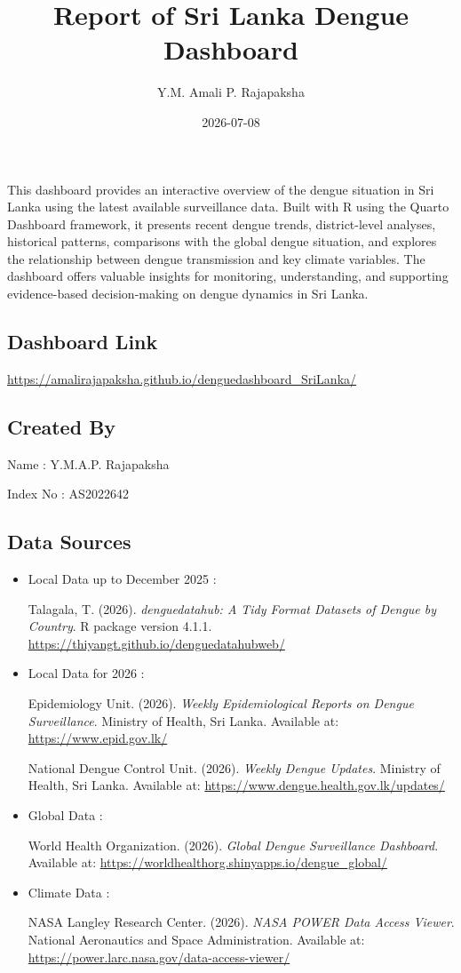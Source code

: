 \documentclass[
  letterpaper,
  DIV=11,
  numbers=noendperiod]{scrartcl}
\title{Report of Sri Lanka Dengue Dashboard}
\author{Y.M. Amali P. Rajapaksha}
\date{2026-07-08}
\begin{document}
\maketitle


This dashboard provides an interactive overview of the dengue situation
in Sri Lanka using the latest available surveillance data. Built with R
using the Quarto Dashboard framework, it presents recent dengue trends,
district-level analyses, historical patterns, comparisons with the
global dengue situation, and explores the relationship between dengue
transmission and key climate variables. The dashboard offers valuable
insights for monitoring, understanding, and supporting evidence-based
decision-making on dengue dynamics in Sri Lanka.

\subsection{Dashboard Link}\label{dashboard-link}

\url{https://amalirajapaksha.github.io/denguedashboard_SriLanka/}

\subsection{Created By}\label{created-by}

Name : Y.M.A.P. Rajapaksha

Index No : AS2022642

\subsection{Data Sources}\label{data-sources}

\begin{itemize}
\item
  Local Data up to December 2025 :

  Talagala, T. (2026). \emph{denguedatahub: A Tidy Format Datasets of
  Dengue by Country}. R package version 4.1.1.
  \url{https://thiyangt.github.io/denguedatahubweb/}
\item
  Local Data for 2026 :

  Epidemiology Unit. (2026). \emph{Weekly Epidemiological Reports on
  Dengue Surveillance}. Ministry of Health, Sri Lanka. Available at:
  \url{https://www.epid.gov.lk/}

  National Dengue Control Unit. (2026). \emph{Weekly Dengue Updates}.
  Ministry of Health, Sri Lanka. Available at:
  \url{https://www.dengue.health.gov.lk/updates/}
\item
  Global Data :

  World Health Organization. (2026). \emph{Global Dengue Surveillance
  Dashboard}. Available at:
  \url{https://worldhealthorg.shinyapps.io/dengue_global/}
\item
  Climate Data :

  NASA Langley Research Center. (2026). \emph{NASA POWER Data Access
  Viewer}. National Aeronautics and Space Administration. Available at:
  \url{https://power.larc.nasa.gov/data-access-viewer/}
\end{itemize}
\end{document}
